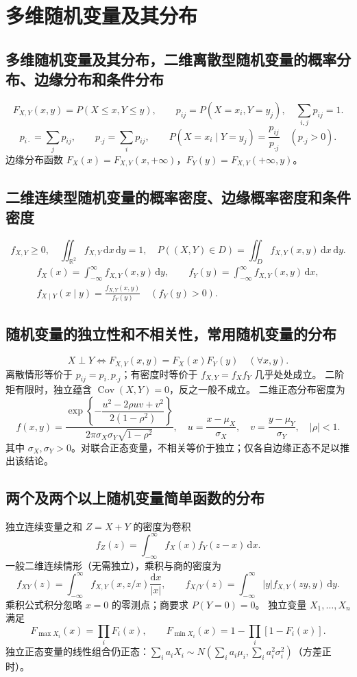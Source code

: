 \documentclass[../main.tex]{subfiles}
\begin{document}
\section{多维随机变量及其分布}
\subsection{多维随机变量及其分布，二维离散型随机变量的概率分布、边缘分布和条件分布}
\[
F_{X,Y}(x,y)=P(X\le x,Y\le y),\qquad p_{ij}=P(X=x_i,Y=y_j),\quad
\sum_{i,j}p_{ij}=1.
\]
\[
p_{i\cdot}=\sum_jp_{ij},\qquad p_{\cdot j}=\sum_ip_{ij},\qquad
P(X=x_i\mid Y=y_j)=\frac{p_{ij}}{p_{\cdot j}}\quad(p_{\cdot j}>0).
\]
边缘分布函数 $F_X(x)=F_{X,Y}(x,+\infty)$，$F_Y(y)=F_{X,Y}(+\infty,y)$。
\subsection{二维连续型随机变量的概率密度、边缘概率密度和条件密度}
\[
f_{X,Y}\ge0,\quad\iint_{\mathbb R^2}f_{X,Y}\,\mathrm dx\,\mathrm dy=1,\quad
P((X,Y)\in D)=\iint_D f_{X,Y}(x,y)\,\mathrm dx\,\mathrm dy.
\]
\[
\begin{gathered}
f_X(x)=\int_{-\infty}^{\infty}f_{X,Y}(x,y)\,\mathrm dy,\qquad
f_Y(y)=\int_{-\infty}^{\infty}f_{X,Y}(x,y)\,\mathrm dx,\\
f_{X\mid Y}(x\mid y)=\frac{f_{X,Y}(x,y)}{f_Y(y)}\quad(f_Y(y)>0).
\end{gathered}
\]
\subsection{随机变量的独立性和不相关性，常用随机变量的分布}
\[
X\perp Y\iff F_{X,Y}(x,y)=F_X(x)F_Y(y)\quad(\forall x,y).
\]
离散情形等价于 $p_{ij}=p_{i\cdot}p_{\cdot j}$；有密度时等价于 $f_{X,Y}=f_Xf_Y$ 几乎处处成立。
二阶矩有限时，独立蕴含 $\operatorname{Cov}(X,Y)=0$，反之一般不成立。
二维正态分布密度为
\[
f(x,y)=\frac{\exp\!\left\{-\dfrac{u^2-2\rho uv+v^2}{2(1-\rho^2)}\right\}}
 {2\pi\sigma_X\sigma_Y\sqrt{1-\rho^2}},\quad
u=\frac{x-\mu_X}{\sigma_X},\quad v=\frac{y-\mu_Y}{\sigma_Y},\quad |\rho|<1.
\]
其中 $\sigma_X,\sigma_Y>0$。对联合正态变量，不相关等价于独立；仅各自边缘正态不足以推出该结论。
\subsection{两个及两个以上随机变量简单函数的分布}
独立连续变量之和 $Z=X+Y$ 的密度为卷积
\[
f_Z(z)=\int_{-\infty}^{\infty}f_X(x)f_Y(z-x)\,\mathrm dx.
\]
一般二维连续情形（无需独立），乘积与商的密度为
\[
f_{XY}(z)=\int_{-\infty}^{\infty}f_{X,Y}(x,z/x)\frac{\mathrm dx}{|x|},\qquad
f_{X/Y}(z)=\int_{-\infty}^{\infty}|y|f_{X,Y}(zy,y)\,\mathrm dy.
\]
乘积公式积分忽略 $x=0$ 的零测点；商要求 $P(Y=0)=0$。
独立变量 $X_1,\ldots,X_n$ 满足
\[
F_{\max X_i}(x)=\prod_iF_i(x),\qquad
F_{\min X_i}(x)=1-\prod_i[1-F_i(x)].
\]
独立正态变量的线性组合仍正态：$\sum_i a_iX_i\sim N(\sum_i a_i\mu_i,\sum_i a_i^2\sigma_i^2)$（方差正时）。
\end{document}

